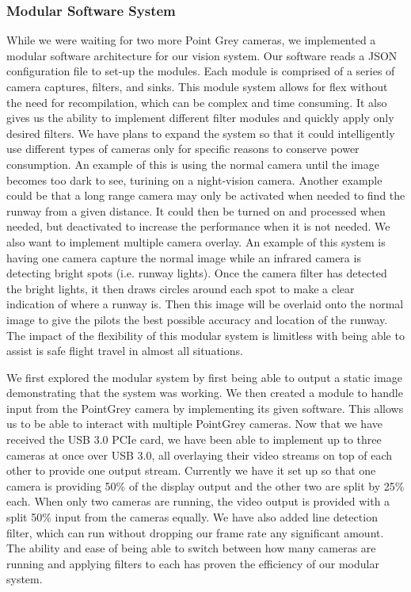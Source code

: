 \documentclass[letterpaper,10pt,titlepage]{IEEEtran}
\begin{document}
   \subsubsection{Modular Software System}
   While we were waiting for two more Point Grey cameras, we implemented a modular software architecture for our vision system. Our software reads a JSON configuration file to set-up the modules. Each module is comprised of a series of camera captures, filters, and sinks. This module system allows for flex without the need for recompilation, which can be complex and time consuming. It also gives us the ability to implement different filter modules and quickly apply only desired filters. We have plans to expand the system so that it could intelligently use different types of cameras only for specific reasons to conserve power consumption. An example of this is using the normal camera until the image becomes too dark to see, turining on a night-vision camera. Another example could be that a long range camera may only be activated when needed to find the runway from a given distance. It could then be turned on and processed when needed, but deactivated to increase the performance when it is not needed. We also want to implement multiple camera overlay. An example of this system is having one camera capture the normal image while an infrared camera is detecting bright spots (i.e. runway lights). Once the camera filter has detected the bright lights, it then draws circles around each spot to make a clear indication of where a runway is. Then this image will be overlaid onto the normal image to give the pilots the best possible accuracy and location of the runway. The impact of the flexibility of this modular system is limitless with being able to assist is safe flight travel in almost all situations.\\ 
\par
We first explored the modular system by first being able to output a static image demonstrating that the system was working. We then created a module to handle input from the PointGrey camera by implementing its given software. This allows us to be able to interact with multiple PointGrey cameras. Now that we have received the USB 3.0 PCIe card, we have been able to implement up to three cameras at once over USB 3.0, all overlaying their video streams on top of each other to provide one output stream. Currently we have it set up so that one camera is providing 50\% of the display output and the other two are split by 25\% each. When only two cameras are running, the video output is provided with a split 50\% input from the cameras equally. We have also added line detection filter, which can run without dropping our frame rate any significant amount. The ability and ease of being able to switch between how many cameras are running and applying filters to each has proven the efficiency of our modular system. 
   
\end{document}
